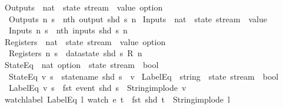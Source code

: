 \begin{isabellebody}
\isanewline
{}\isamarkupfalse%
\ Outputs\ {\isacharcolon}{\isacharcolon}\ {\isachardoublequoteopen}nat\ {\isasymRightarrow}\ state\ stream\ {\isasymRightarrow}\ value\ option{\isachardoublequoteclose}\ \isanewline
\ \ {\isachardoublequoteopen}Outputs\ n\ s\ {\isasymequiv}\ nth\ {\isacharparenleft}output\ {\isacharparenleft}shd\ s{\isacharparenright}{\isacharparenright}\ n{\isachardoublequoteclose}\isanewline
\isanewline
{}\isamarkupfalse%
\ Inputs\ {\isacharcolon}{\isacharcolon}\ {\isachardoublequoteopen}nat\ {\isasymRightarrow}\ state\ stream\ {\isasymRightarrow}\ value{\isachardoublequoteclose}\ \isanewline
\ \ {\isachardoublequoteopen}Inputs\ n\ s\ {\isasymequiv}\ nth\ {\isacharparenleft}inputs\ {\isacharparenleft}shd\ s{\isacharparenright}{\isacharparenright}\ n{\isachardoublequoteclose}\isanewline
\isanewline
{}\isamarkupfalse%
\ Registers\ {\isacharcolon}{\isacharcolon}\ {\isachardoublequoteopen}nat\ {\isasymRightarrow}\ state\ stream\ {\isasymRightarrow}\ value\ option{\isachardoublequoteclose}\ \isanewline
\ \ {\isachardoublequoteopen}Registers\ n\ s\ {\isasymequiv}\ datastate\ {\isacharparenleft}shd\ s{\isacharparenright}\ {\isacharparenleft}R\ n{\isacharparenright}{\isachardoublequoteclose}\isanewline
\isanewline
{}\isamarkupfalse%
\ StateEq\ {\isacharcolon}{\isacharcolon}\ {\isachardoublequoteopen}nat\ option\ {\isasymRightarrow}\ state\ stream\ {\isasymRightarrow}\ bool{\isachardoublequoteclose}\ \isanewline
\ \ {\isachardoublequoteopen}StateEq\ v\ s\ {\isasymequiv}\ statename\ {\isacharparenleft}shd\ s{\isacharparenright}\ {\isacharequal}\ v{\isachardoublequoteclose}\isanewline
\isanewline
{}\isamarkupfalse%
\ LabelEq\ {\isacharcolon}{\isacharcolon}\ {\isachardoublequoteopen}string\ {\isasymRightarrow}\ state\ stream\ {\isasymRightarrow}\ bool{\isachardoublequoteclose}\ \isanewline
\ \ {\isachardoublequoteopen}LabelEq\ v\ s\ {\isasymequiv}\ fst\ {\isacharparenleft}event\ {\isacharparenleft}shd\ s{\isacharparenright}{\isacharparenright}\ {\isacharequal}\ {\isacharparenleft}String{\isachardot}implode\ v{\isacharparenright}{\isachardoublequoteclose}\isanewline
\isanewline
{}\isamarkupfalse%
\ watch{\isacharunderscore}label{\isacharcolon}\ {\isachardoublequoteopen}LabelEq\ l\ {\isacharparenleft}watch\ e\ t{\isacharparenright}\ {\isacharequal}\ {\isacharparenleft}fst\ {\isacharparenleft}shd\ t{\isacharparenright}\ {\isacharequal}\ String{\isachardot}implode\ l{\isacharparenright}{\isachardoublequoteclose}\isanewline

\end{isabellebody}
